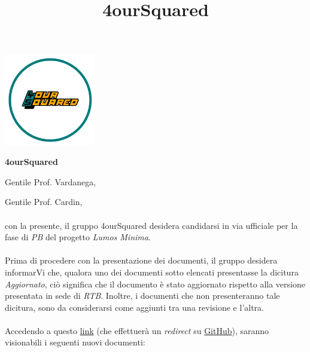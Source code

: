 \documentclass[12pt, a4paper]{article}
\begin{document}
\graphicspath{ {../../template} }
\title{4ourSquared}
\begin{center}
    \includegraphics[width=0.30\textwidth]{4ourSquared_logo}
\end{center}
\begin{center}
    {\Large \textbf{4ourSquared}}\\[24pt]
\end{center}

Gentile Prof. Vardanega,


Gentile Prof. Cardin,\\\\
con la presente, il gruppo 4ourSquared desidera candidarsi in via ufficiale per la fase di \textit{PB} del progetto \textit{Lumos Minima}.\\\\
Prima di procedere con la presentazione dei documenti, il gruppo desidera informarVi che, qualora uno dei documenti sotto elencati presentasse la dicitura \textit{Aggiornato}, ciò significa che il documento è stato aggiornato rispetto alla versione presentata in sede di \textit{RTB}. Inoltre, i documenti che non presenteranno tale dicitura, sono da considerarsi come aggiunti tra una revisione e l'altra.\\\\
Accedendo a questo \href{https://github.com/4ourSquared/LumosMinima/tree/main/public}{link} (che effettuerà un \textit{redirect} su \href{https://github.com/}{GitHub}), saranno visionabili i seguenti nuovi documenti:
\end{document}
